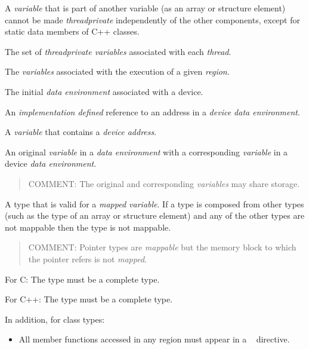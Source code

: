 A \emph{variable} that is part of another variable (as an array or structure element) cannot 
be made \emph{threadprivate} independently of the other components, except for static 
data members of C++ classes. 
\glossarydefend

\glossarydefstart
The set of \emph{threadprivate variables} associated with each \emph{thread}.
\glossarydefend

\glossarydefstart
The \emph{variables} associated with the execution of a given \emph{region}. 
\glossarydefend

\glossarydefstart
The initial \emph{data environment} associated with a device.
\glossarydefend
\bigskip

\glossarydefstart
An \emph{implementation defined} reference to an address in a \emph{device
  data environment}.
\glossarydefend

\glossarydefstart
A \emph{variable} that contains a \emph{device address}.
\glossarydefend


\glossarydefstart
An original \emph{variable} in a \emph{data environment} with a corresponding \emph{variable} in a 
device \emph{data environment}.

\begin{quote}
COMMENT: The original and corresponding \emph{variables} may share storage.
\end{quote}
\glossarydefend

\glossarydefstart
A type that is valid for a \emph{mapped variable}. If a type is composed from other types 
(such as the type of an array or structure element) and any of the other types are 
not mappable then the type is not mappable.

\begin{quote}
COMMENT: Pointer types are \emph{mappable} but the memory block to which the pointer refers is not \emph{mapped}.
\end{quote}

For C: 
\nopagebreak
The type must be a complete type.

For C++: 
\nopagebreak
The type must be a complete type.

In addition, for class types:
\begin{itemize}
\item All member functions accessed in any  region must appear in a 
~ directive.
\end{itemize}

